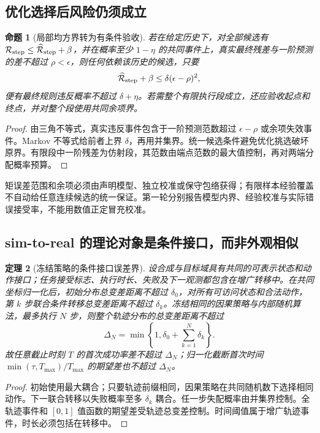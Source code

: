\documentclass[UTF8,fontset=fandol,11pt,a4paper]{ctexart}
\theoremstyle{plain}
\newtheorem{theorem}{定理}[section]
\newtheorem{proposition}[theorem]{命题}
\theoremstyle{definition}
\theoremstyle{remark}
\numberwithin{equation}{section}
\begin{document}
\subsection{优化选择后风险仍须成立}
\begin{proposition}[局部均方界转为有条件验收]
若在给定历史下，对全部候选有 $\mathcal R_{\rm step}\le\widehat{\mathcal R}_{\rm step}+\beta$，并在概率至少 $1-\eta$ 的共同事件上，真实最终残差与一阶预测的差不超过 $\rho<\epsilon$，则任何依赖该历史的候选，只要
\begin{equation}
 \widehat{\mathcal R}_{\rm step}+\beta\le\delta(\epsilon-\rho)^2,
\end{equation}
便有最终规则违反概率不超过 $\delta+\eta$。若需整个有限执行段成立，还应验收起点和终点，并对整个段使用共同余项界。
\end{proposition}
\begin{proof}
由三角不等式，真实违反事件包含于一阶预测范数超过 $\epsilon-\rho$ 或余项失效事件。Markov 不等式给前者上界 $\delta$，再用并集界。统一候选条件避免优化挑选破坏原界。有限段中一阶残差为仿射段，其范数由端点范数的最大值控制，再对两端分配概率预算。
\end{proof}
矩误差范围和余项必须由声明模型、独立校准或保守包络获得；有限样本经验覆盖不自动给任意连续候选的统一保证。第一轮分别报告模型内界、经验校准与实际错误接受率，不能用数值正定冒充校准。

\subsection{sim-to-real 的理论对象是条件接口，而非外观相似}
\begin{theorem}[冻结策略的条件接口误差界]
设合成与目标域具有共同的可表示状态和动作接口；任务接受标志、执行时长、失败及下一观测都包含在增广转移中。在共同坐标归一化后，初始分布总变差距离不超过 $\delta_0$，对所有可访问状态和合法动作，第 $k$ 步联合条件转移总变差距离不超过 $\delta_k$。冻结相同的因果策略与内部随机算法，最多执行 $N$ 步，则整个轨迹分布的总变差距离不超过
\begin{equation}
 \Delta_N=\min\left\{1,\delta_0+\sum_{k=1}^N\delta_k\right\}.
 \label{eq:transfer}
\end{equation}
故任意截止时刻 $T$ 的首次成功率差不超过 $\Delta_N$；归一化截断首次时间 $\min(\tau,T_{\max})/T_{\max}$ 的期望差也不超过 $\Delta_N$。
\end{theorem}
\begin{proof}
初始使用最大耦合；只要轨迹前缀相同，因果策略在共同随机数下选择相同动作。下一联合转移以失败概率至多 $\delta_k$ 耦合。任一步失配概率由并集界控制。全轨迹事件和 $[0,1]$ 值函数的期望差受轨迹总变差控制。时间阈值属于增广轨迹事件，时长必须包括在转移中。
\end{proof}
\end{document}
